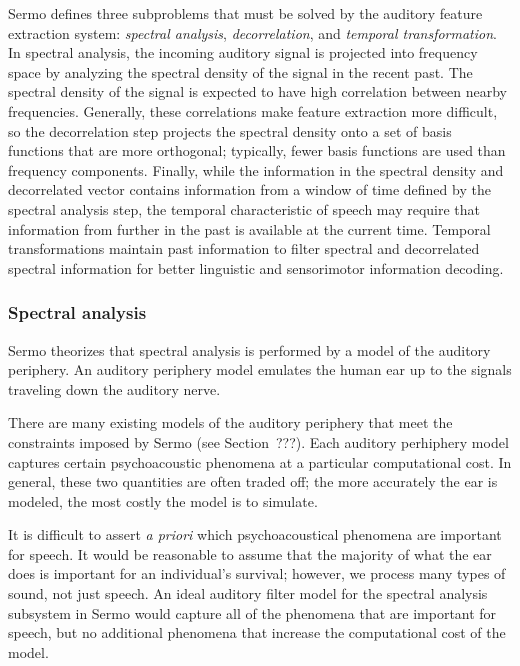 Sermo defines three subproblems
that must be solved
by the auditory feature extraction system:
\textit{spectral analysis},
\textit{decorrelation},
and \textit{temporal transformation}.
In spectral analysis,
the incoming auditory signal
is projected into frequency space
by analyzing the spectral density
of the signal in the recent past.
The spectral density of the signal
is expected to have high
correlation between nearby frequencies.
Generally, these correlations
make feature extraction more difficult,
so the decorrelation step
projects the spectral density
onto a set of basis functions
that are more orthogonal;
typically, fewer basis functions
are used than frequency components.
Finally, while the information
in the spectral density
and decorrelated vector
contains information from
a window of time defined by
the spectral analysis step,
the temporal characteristic of speech
may require that information
from further in the past is available
at the current time.
Temporal transformations
maintain past information
to filter spectral
and decorrelated spectral information
for better linguistic
and sensorimotor information decoding.

\subsubsection{Spectral analysis}

Sermo theorizes that spectral analysis
is performed by a model
of the auditory periphery.
An auditory periphery model
emulates the human ear
up to the signals
traveling down the auditory nerve.

There are many existing
models of the auditory periphery
that meet the constraints
imposed by Sermo (see Section~???).
Each auditory perhiphery model
captures certain psychoacoustic phenomena
at a particular computational cost.
In general, these two quantities
are often traded off;
the more accurately the ear is modeled,
the most costly the model is to simulate.

It is difficult to assert \textit{a priori}
which psychoacoustical phenomena
are important for speech.
It would be reasonable to assume that
the majority of what the ear does
is important for an individual's survival;
however, we process many types of sound,
not just speech.
An ideal auditory filter model
for the spectral analysis subsystem
in Sermo
would capture all of the phenomena
that are important for speech,
but no additional phenomena
that increase the computational cost
of the model.

